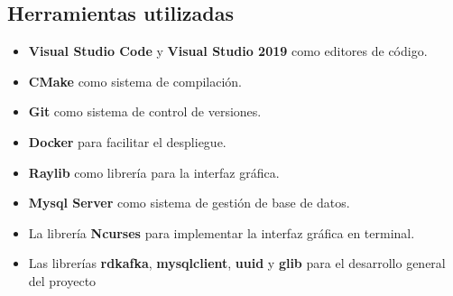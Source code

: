 \documentclass[a4paper,12pt]{article}
\begin{document}
\subsection{Herramientas utilizadas}
\begin{itemize}
  \item \textbf{Visual Studio Code} y \textbf{Visual Studio 2019} como editores de código.
  \item \textbf{CMake} como sistema de compilación.
  \item \textbf{Git} como sistema de control de versiones.
  \item \textbf{Docker} para facilitar el despliegue.
  \item \textbf{Raylib} como librería para la interfaz gráfica.
  \item \textbf{Mysql Server} como sistema de gestión de base de datos.
  \item La librería \textbf{Ncurses} para implementar la interfaz gráfica en terminal.
  \item Las librerías \textbf{rdkafka}, \textbf{mysqlclient}, \textbf{uuid} y \textbf{glib} para el desarrollo general del proyecto
\end{itemize}
\end{document}

